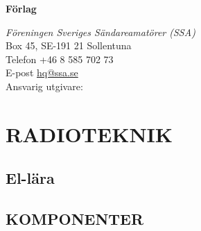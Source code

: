 \documentclass[a4paper,twoside,openright]{book}
\begin{document}

\vfill

\noindent
\textbf{Förlag}

\noindent
\textit{Föreningen Sveriges Sändareamatörer (SSA)}\\
Box 45, SE-191 21 Sollentuna\\
Telefon +46 8 585 702 73\\
E-post \href{mailto:hq@ssa.se}{hq@ssa.se}\\[\baselineskip]

\noindent
Ansvarig utgivare:\\

\cleardoublepage
\pagestyle{fancy}


\tableofcontents

\setlength{\parindent}{0px}
\setlength{\parskip}{1ex plus 0.5ex minus 0.2ex}

\mainmatter

%




\part{RADIOTEKNIK}
\chapter{El-lära}
\label{ellära}











\chapter{KOMPONENTER}
\label{komponenter}










\end{document}

